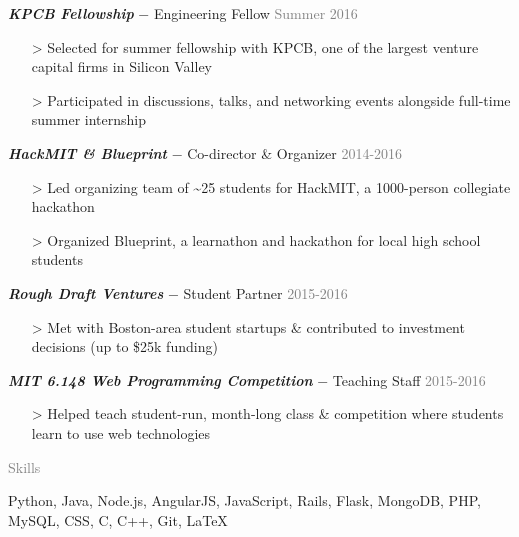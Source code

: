 \documentclass[11pt]{article}
\newcommand{\rsection}[1]{\vspace{1.5em}\textcolor{gray}{\Large \robotoslab #1}\vspace{0.5em}}
\newcommand{\bt}[1]{\textit{\textbf{#1}}} %
\newcommand{\gap}[0]{\vspace{0.5em}} %
\newcommand{\dash}[0]{ $-$ } %
\newcommand{\gray}[1]{\textcolor{gray}{#1}}
\newcommand{\e}[0]{> }
\begin{document}
\gap

\bt{KPCB Fellowship}\dash Engineering Fellow \hfill \gray{Summer 2016}

\begin{itemize}
\item[\e] Selected for summer fellowship with KPCB, one of the largest venture capital firms in Silicon Valley
\item[\e] Participated in discussions, talks, and networking events alongside full-time summer internship
\end{itemize}

\gap

\bt{HackMIT \& Blueprint}\dash Co-director \& Organizer \hfill \gray{2014-2016}

\begin{itemize}
\item[\e] Led organizing team of \textasciitilde 25 students for HackMIT, a 1000-person collegiate hackathon
\item[\e] Organized Blueprint, a learnathon and hackathon for local high school students
\end{itemize}

\gap

\bt{Rough Draft Ventures}\dash Student Partner \hfill \gray{2015-2016}

\begin{itemize}
\item[\e] Met with Boston-area student startups \& contributed to investment decisions (up to \$25k funding)
\end{itemize}

\gap

\bt{MIT 6.148 Web Programming Competition}\dash Teaching Staff \hfill \gray{2015-2016}

\begin{itemize}
\item[\e] Helped teach student-run, month-long class \& competition where students learn to use web technologies
\end{itemize}

\rsection{Skills}

Python, Java, Node.js, AngularJS, JavaScript, Rails, Flask, MongoDB, PHP, MySQL, CSS, C, C++, Git, {\selectfont\LaTeX}
\end{document}
